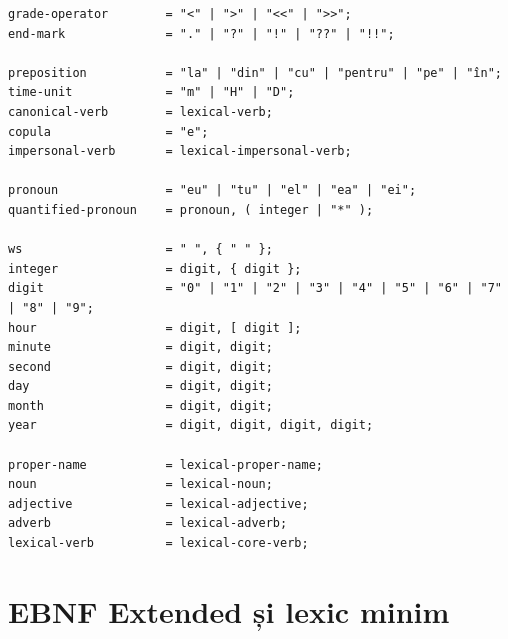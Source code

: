 \documentclass[12pt,onecolumn,letterpaper]{article}
\begin{document}
\begin{verbatim}
grade-operator        = "<" | ">" | "<<" | ">>";
end-mark              = "." | "?" | "!" | "??" | "!!";

preposition           = "la" | "din" | "cu" | "pentru" | "pe" | "în";
time-unit             = "m" | "H" | "D";
canonical-verb        = lexical-verb;
copula                = "e";
impersonal-verb       = lexical-impersonal-verb;

pronoun               = "eu" | "tu" | "el" | "ea" | "ei";
quantified-pronoun    = pronoun, ( integer | "*" );

ws                    = " ", { " " };
integer               = digit, { digit };
digit                 = "0" | "1" | "2" | "3" | "4" | "5" | "6" | "7" | "8" | "9";
hour                  = digit, [ digit ];
minute                = digit, digit;
second                = digit, digit;
day                   = digit, digit;
month                 = digit, digit;
year                  = digit, digit, digit, digit;

proper-name           = lexical-proper-name;
noun                  = lexical-noun;
adjective             = lexical-adjective;
adverb                = lexical-adverb;
lexical-verb          = lexical-core-verb;
\end{verbatim}
\normalsize

\section{EBNF Extended și lexic minim}
\end{document}
